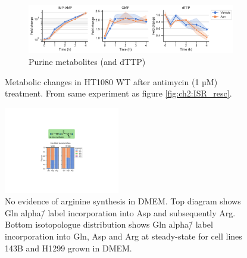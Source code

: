 \begin{figure}[!ht]
\begin{subfigure}[b]{0.9\textwidth}
         \label{fig:app_ch2:HT1080_Anti_pyr}
     \end{subfigure}
     \hfill
     \begin{subfigure}[b]{0.68\textwidth}
         \includegraphics[width=\textwidth]{figures/chap2/app/HT1080_Anti_pur.pdf}
         \caption{Purine metabolites (and dTTP)}
         \label{fig:app_ch2:HT1080_Anti_pur}
     \end{subfigure}
     \hfill
        \caption[Metabolic changes in HT1080 after antimycin treatment]{
        Metabolic changes in HT1080 WT after antimycin (1 µM) treatment.
        From same experiment as figure \ref{fig:ch2:ISR_resc}.
        }
        \label{fig:app_ch2:HT1080_Anti_metab}
\end{figure}



















\begin{figure}
    \centering
    \includegraphics[width=0.45\textwidth]{figures/chap2/app/arg_syn.pdf}
    \caption[No evidence of arginine synthesis in DMEM]{
    No evidence of arginine synthesis in DMEM.
    Top diagram shows Gln alpha\=/\hNi{} label incorporation into Asp and subsequently Arg.
    Bottom isotopologue distribution shows Gln alpha\=/\hNi{} label incorporation into Gln, Asp and Arg at steady-state for cell lines 143B and H1299 grown in DMEM.
    }
    \label{fig:app_ch2:arg_syn}
\end{figure}










